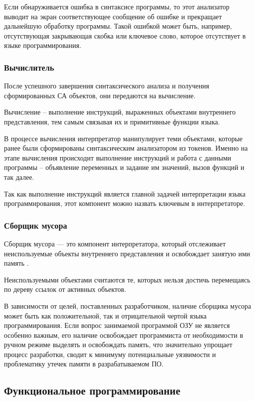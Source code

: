 Если обнаруживается ошибка в синтаксисе программы, то этот анализатор выводит на экран соответствующее сообщение об ошибке и прекращает дальнейшую обработку программы. Такой ошибкой может быть, например, отсутствующая закрывающая скобка или ключевое слово, которое отсутствует в языке программирования.



\subsubsection{Вычислитель}

После успешного завершения синтаксического анализа и получения сформированных СА объектов, они передаются на вычисление.

Вычисление -- выполнение инструкций, выраженных объектами внутреннего представления, тем самым связывая их и примитивные функции языка.

В процессе вычисления интерпретатор манипулирует теми объектами, которые ранее были сформированы синтаксическим анализатором из токенов. Именно на этапе вычисления происходит выполнение инструкций и работа с данными программы -- объявление переменных и задание им значений, вызов функций и так далее.

Так как выполнение инструкций является главной задачей интерпретации языка программирования, этот компонент можно назвать ключевым в интерпретаторе.


\subsubsection{Сборщик мусора}
Сборщик мусора — это компонент интерпретатора, который отслеживает неиспользуемые объекты внутреннего представления и освобождает занятую ими память \cite{e17}.

Неиспользуемыми объектами считаются те, которых нельзя достичь перемещаясь по дереву ссылок от активных объектов.

В зависимости от целей, поставленных разработчиком, наличие сборщика мусора может быть как положительной, так и отрицательной чертой языка программирования. Если вопрос занимаемой программой ОЗУ не является особенно важным, его наличие освобождает программиста от необходимости в ручном режиме выделять и освобождать память, что значительно упрощает процесс разработки, сводит к минимуму потенциальные уязвимости и проблематику утечек памяти в разрабатываемом ПО.


\subsection{Функциональное программирование}

